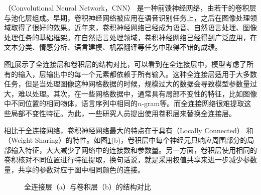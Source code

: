 （Convolutional Neural Network，CNN） 是一种前馈神经网络，由若干的卷积层与池化层组成。早期，卷积神经网络被应用在语音识别任务上，之后在图像处理领域取得了很好的效果。近年来，卷积神经网络已经成为语音、自然语言处理、图像处理任务的基础框架。在自然语言处理领域，卷积神经网络已经得到广泛应用，在文本分类、情感分析、语言建模、机器翻译等任务中取得不错的成绩。

\parinterval 图\ref{fig:11-1}展示了全连接层和卷积层的结构对比，可以看到在全连接层中，模型考虑了所有的输入，层输出中的每一个元素都依赖于所有输入。这种全连接层适用于大多数任务，但是当处理图像这种网格数据的时候，规模过大的数据会导致模型参数量过大，难以处理。其次，在一些网格数据中，通常具有局部不变性的特征，比如图像中不同位置的相同物体，语言序列中相同的$n$-gram等。而全连接网络很难提取这些局部不变性特征。为此，一些研究人员提出使用卷积层来替换全连接层。

\parinterval 相比于全连接网络，卷积神经网络最大的特点在于具有{\small{}}（Locally Connected） 和{\small{}}（Weight Sharing）的特性。如图\ref{fig:11-1}(b)，卷积层中每个神经元只响应周围部分的局部输入特征，大大减少了网络中的连接数和参数量。另一方面，卷积层使用相同的卷积核对不同位置进行特征提取，换句话说，就是采用权值共享来进一步减少参数量，共享的参数对应于图中相同颜色的连接。

\begin{figure}[htp]
\centering
%
\hspace{2cm}
\caption{全连接层（a）与卷积层（b）的结构对比}
\label{fig:11-1}
\end{figure}

